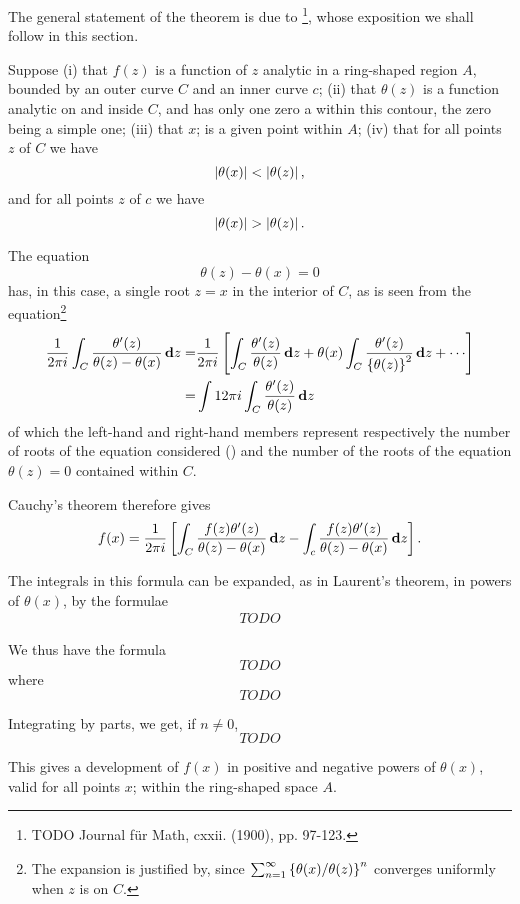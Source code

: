 The general statement of the theorem is due to
\Teixeira\footnote{TODO Journal f\"ur Math, cxxii. (1900), pp.
  97-123.}, whose exposition we shall follow in this section.

Suppose (i) that $f(z)$ is a function of $z$ analytic in a ring-shaped
region $A$, bounded by an outer curve $C$ and an inner curve $c$;
(ii) that $\theta(z)$ is a function analytic on and inside $C$,
and has only one zero a
within this contour, the zero being a simple one;
(iii) that $x$; is a given point within $A$;
(iv) that for all points $z$ of $C$ we have
$$
\left| \theta(x) \right| < \left| \theta(z) \right|,
$$
and for all points $z$ of $c$ we have
$$
\left| \theta(x) \right| > \left| \theta(z) \right|.
$$

The equation 
$$
\theta(z) - \theta(x) = 0
$$
has, in this case, a single root $z = x$ in the interior of $C$, as is
seen from the equation\footnote{The expansion is justified
  by, since
  $\sum_{n=1}^{\infty} \left\{ \theta(x)/\theta(z) \right\}^{n}$
  converges uniformly when $z$
  is on $C$.}
\begin{align*}
  \frac{1}{2 \pi i}
  \int_{C} \frac{\theta'(z)}{\theta(z) - \theta(x)} \dmeasure z
  =&
  \frac{1}{2 \pi i}
  \thebracket{
    \int_{C} \frac{\theta'(z)}{\theta(z)} \dmeasure z
    +
    \theta(x)
    \int_{C} \frac{\theta'(z)}{ \thebrace{\theta(z)}^{2}}
    \dmeasure z
    + \cdots
  }
  \\
  =&
  \int{1}{2 \pi i}
  \int_{C} \frac{\theta'(z)}{\theta(z)} \dmeasure z
\end{align*}
of which the left-hand and right-hand members represent respectively
the number of roots of the equation considered
() and the
number of the roots of the equation $\theta(z) = 0$ contained within
$C$.

Cauchy's theorem therefore gives
$$
f(x)
=
\frac{1}{2 \pi i}
\left[ 
  \int_{C} \frac{f(z) \theta'(z)}{\theta(z) - \theta(x)} \, \mathbf{d} z
  -
  \int_{c} \frac{f(z) \theta'(z)}{\theta(z) - \theta(x)} \, \mathbf{d} z
 \right].
$$

% 
%
The integrals in this formula can be expanded, as in Laurent's
theorem, in powers of $\theta(x)$, by the formulae
\begin{align*}
  TODO
\end{align*}

We thus have the formula
$$
TODO
$$
where
$$
TODO
$$

Integrating by parts, we get, if $n \neq 0$,
$$
TODO
$$

This gives a development of $f(x)$ in positive and negative powers of
$\theta(x)$, valid for all points $x$; within the ring-shaped space $A$.

